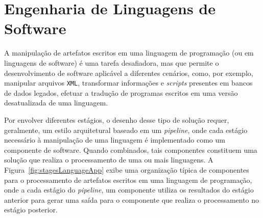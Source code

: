 

\section{Engenharia de Linguagens de Software}\label{sec:softEng}





A manipulação de artefatos escritos em 
uma linguagem de programação (ou em linguagens de software) 
é uma tarefa desafiadora, mas que permite o desenvolvimento 
de software aplicável a diferentes cenários, como, por exemplo, 
manipular arquivos \texttt{XML}, transformar 
informações e \textit{scripts} presentes 
em bancos de dados legados, efetuar a tradução de programas 
escritos em uma versão desatualizada de uma linguagem. 

Por envolver diferentes estágios, o desenho desse tipo de solução requer, geralmente, 
um estilo arquitetural baseado em um \emph{pipeline},  onde cada estágio necessário à manipulação de uma linguagem é implementado como um componente de software. Quando combinados, 
tais componentes constituem uma solução que realiza o processamento 
de uma ou mais linguagens. A Figura~\ref{fig:stagesLanguageApp} exibe uma organização 
típica de componentes para o processamento de artefatos escritos em uma linguagem de 
programação, onde a cada estágio do \emph{pipeline}, um componente 
utiliza os resultados do estágio anterior para gerar uma saída para o componente 
que realiza o processamento no estágio posterior.  

